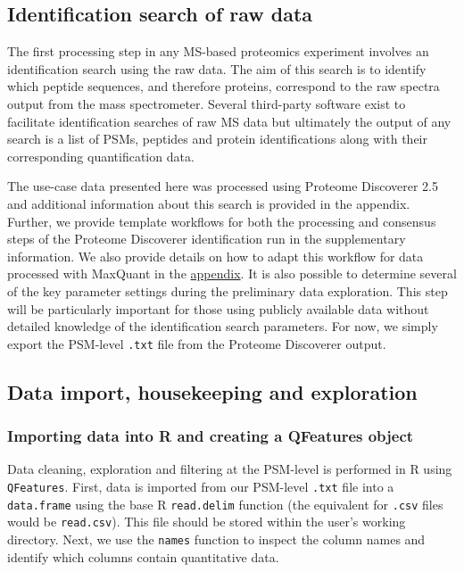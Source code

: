\documentclass[9pt,a4paper,]{extarticle}
\begin{document}
\subsection{Identification search of raw data}\label{identification-search-of-raw-data}

The first processing step in any MS-based proteomics experiment involves an
identification search using the raw data. The aim of this search is to identify
which peptide sequences, and therefore proteins, correspond to the raw spectra
output from the mass spectrometer. Several third-party software exist to
facilitate identification searches of raw MS data but ultimately the output of
any search is a list of PSMs, peptides and protein identifications along with
their corresponding quantification data.

The use-case data presented here was processed using Proteome Discoverer 2.5 and
additional information about this search is provided in the appendix. Further,
we provide template workflows for both the processing and consensus steps of the
Proteome Discoverer identification run in the supplementary information. We also
provide details on how to adapt this workflow for data processed with MaxQuant in
the \href{https://github.com/CambridgeCentreForProteomics/f1000_expression_proteomics}{appendix}.
It is also possible to determine several of the key parameter settings during the
preliminary data exploration. This step will be particularly important for those
using publicly available data without detailed knowledge of the identification
search parameters. For now, we simply export the PSM-level \texttt{.txt} file from the
Proteome Discoverer output.

\subsection{Data import, housekeeping and exploration}\label{data-import-housekeeping-and-exploration}

\subsubsection{Importing data into R and creating a QFeatures object}\label{importing-data-into-r-and-creating-a-qfeatures-object}

Data cleaning, exploration and filtering at the PSM-level is performed in R
using \texttt{QFeatures}. First, data is imported from our PSM-level \texttt{.txt} file into a
\texttt{data.frame} using the base R \texttt{read.delim} function (the equivalent for \texttt{.csv}
files would be \texttt{read.csv}). This file should be stored within the user's working
directory. Next, we use the \texttt{names} function to inspect the column names and
identify which columns contain quantitative data.
\end{document}
